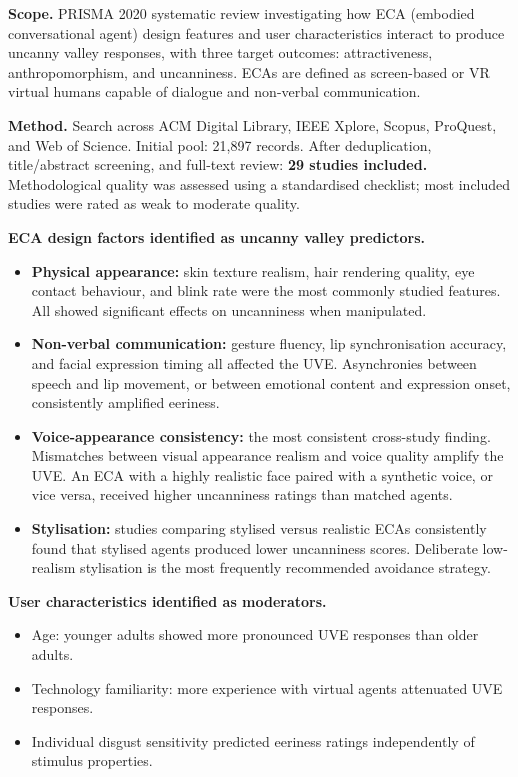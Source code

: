 \documentclass[11pt, a4paper]{article}
\begin{document}
\textbf{Scope.} PRISMA 2020 systematic review investigating how ECA (embodied conversational agent) design features and user characteristics interact to produce uncanny valley responses, with three target outcomes: attractiveness, anthropomorphism, and uncanniness. ECAs are defined as screen-based or VR virtual humans capable of dialogue and non-verbal communication.

\textbf{Method.} Search across ACM Digital Library, IEEE Xplore, Scopus, ProQuest, and Web of Science. Initial pool: 21,897 records. After deduplication, title/abstract screening, and full-text review: \textbf{29 studies included.} Methodological quality was assessed using a standardised checklist; most included studies were rated as weak to moderate quality.

\textbf{ECA design factors identified as uncanny valley predictors.}
\begin{itemize}[leftmargin=2em]
  \item \textbf{Physical appearance:} skin texture realism, hair rendering quality, eye contact behaviour, and blink rate were the most commonly studied features. All showed significant effects on uncanniness when manipulated.
  \item \textbf{Non-verbal communication:} gesture fluency, lip synchronisation accuracy, and facial expression timing all affected the UVE. Asynchronies between speech and lip movement, or between emotional content and expression onset, consistently amplified eeriness.
  \item \textbf{Voice-appearance consistency:} the most consistent cross-study finding. Mismatches between visual appearance realism and voice quality amplify the UVE. An ECA with a highly realistic face paired with a synthetic voice, or vice versa, received higher uncanniness ratings than matched agents.
  \item \textbf{Stylisation:} studies comparing stylised versus realistic ECAs consistently found that stylised agents produced lower uncanniness scores. Deliberate low-realism stylisation is the most frequently recommended avoidance strategy.
\end{itemize}

\textbf{User characteristics identified as moderators.}
\begin{itemize}[leftmargin=2em]
  \item Age: younger adults showed more pronounced UVE responses than older adults.
  \item Technology familiarity: more experience with virtual agents attenuated UVE responses.
  \item Individual disgust sensitivity predicted eeriness ratings independently of stimulus properties.
\end{itemize}
\end{document}

